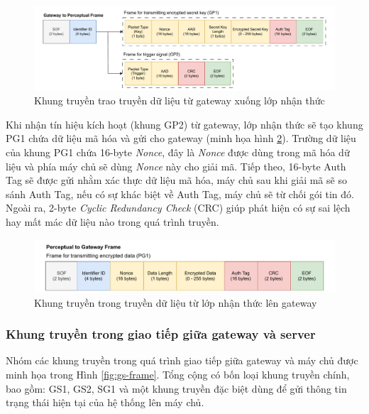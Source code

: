 \begin{figure}[h]
    \centering
    \includegraphics[width=1\linewidth]{gp-frame.pdf}
    \caption{Khung truyền trao truyền dữ liệu từ gateway xuống lớp nhận thức}
    \label{fig:gp}
\end{figure}

Khi nhận tín hiệu kích hoạt (khung GP2) từ gateway, lớp nhận thức sẽ tạo khung PG1 chứa dữ liệu mã hóa và gửi cho gateway (minh họa hình \ref{fig:pg-frame}). Trường dữ liệu của khung PG1 chứa 16-byte \textit{Nonce}, đây là \textit{Nonce} được dùng trong mã hóa dữ liệu và phía máy chủ sẽ dùng \textit{Nonce} này cho giải mã. Tiếp theo, 16-byte Auth Tag sẽ được gửi nhằm xác thực dữ liệu mã hóa, máy chủ sau khi giải mã sẽ so sánh Auth Tag, nếu có sự khác biệt về Auth Tag, máy chủ sẽ từ chối gói tin đó. Ngoài ra, 2-byte \textit{Cyclic Redundancy Check} (CRC) giúp phát hiện có sự sai lệch hay mất mác dữ liệu nào trong quá trình truyền.

\begin{figure}[H]
    \centering
    \includegraphics[width=0.9\linewidth]{pg-frame.pdf}
    \caption{Khung truyền trong truyền dữ liệu từ lớp nhận thức lên gateway}
    \label{fig:pg-frame}
\end{figure}

\subsubsection{Khung truyền trong giao tiếp giữa gateway và server}
\label{sec:gs}
Nhóm các khung truyền trong quá trình giao tiếp giữa gateway và máy chủ được minh họa trong Hình \ref{fig:gs-frame}. Tổng cộng có bốn loại khung truyền chính, bao gồm: GS1, GS2, SG1 và một khung truyền đặc biệt dùng để gửi thông tin trạng thái hiện tại của hệ thống lên máy chủ.

